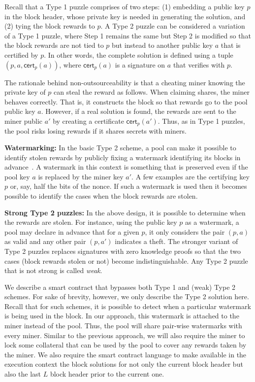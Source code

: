 \documentclass{llncs}
\begin{document}
Recall that a Type 1 puzzle comprises of two steps: (1) embedding a public key $p$ in the block header, whose private key is needed in generating the solution, and (2) tying the block rewards to $p$. 
A Type 2 puzzle can be considered a variation of a Type 1 puzzle, where Step 1 remains the same but Step 2 is modified so that the block rewards are not tied to $p$ but instead to another public key $a$ that is certified by $p$. In other words, the complete solution is defined using a tuple $(p, a, \textsf{cert}_p(a))$, where $\textsf{cert}_p(a)$ is a signature on $a$ that verifies with $p$. 

The rationale behind non-outsourceability is that a cheating miner knowing the private key of $p$ can steal the reward as follows. When claiming shares, the miner behaves correctly. That is, it constructs the block so that rewards go to the pool public key $a$. However, if a real solution is found, the rewards are sent to the miner public $a'$ by creating a certificate $\textsf{cert}_p(a')$. Thus, as in Type 1 puzzles, the pool risks losing rewards if it shares secrets with miners. 


\textbf{Watermarking:} In the basic Type 2 scheme, a pool can make it possible to identify stolen rewards by publicly fixing a watermark identifying its blocks in advance~\cite{miller2015nonoutsourceable}. A watermark in this context is something that is preserved even if the pool key $a$ is replaced by the miner key $a'$. A few examples are the certifying key $p$ or, say, half the bits of the nonce. If such a watermark is used then it becomes possible to identify the cases when the block rewards are stolen. 

\textbf{Strong Type 2 puzzles:} In the above design, it is possible to determine when the rewards are stolen. For instance, using the public key $p$ as a watermark, a pool may declare in advance that for a given $p$, it only considers the pair $(p, a)$ as valid and any other pair $(p, a')$ indicates a theft. The stronger variant of Type 2 puzzles replaces signatures with zero knowledge proofs so that the two cases (block rewards stolen or not) become indistinguishable. Any Type 2 puzzle that is not strong is called {\em weak}.

We describe a smart contract that bypasses both Type 1 and (weak) Type 2 schemes. For sake of brevity, however, we only describe the Type 2 solution here. Recall that for such schemes, it is possible to detect when a particular watermark is being used in the block. In our approach, this watermark is attached to the miner instead of the pool. Thus, the pool will share pair-wise watermarks with every miner. Similar to the previous approach, we will also require the miner to lock some collateral that can be used by the pool to cover any rewards taken by the miner.
We also require the smart contract language to make available in the execution context the block solutions for not only the current block header but also the last $L$ block header prior to the current one. 
\end{document}

